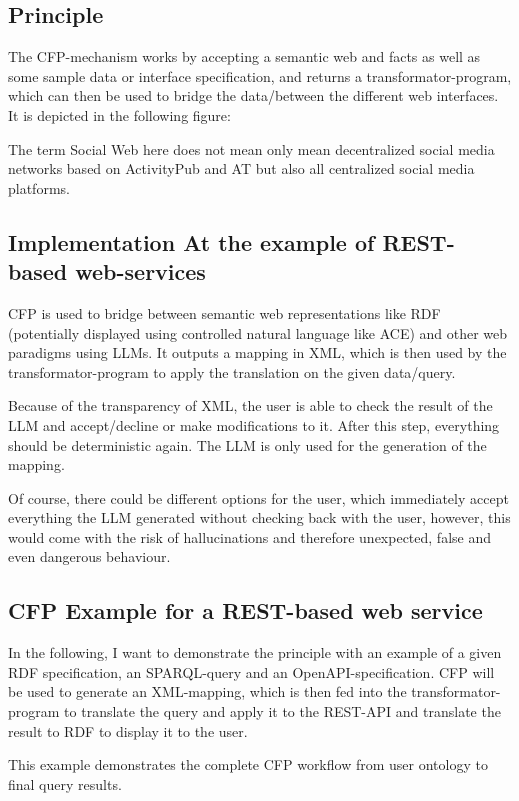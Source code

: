 \documentclass[12pt,a4paper]{article}
\begin{document}
\subsection{Principle}

The CFP-mechanism works by accepting a semantic web and facts as well as some sample data or interface specification, and returns a transformator-program, which can then be used to bridge the data/between the different web interfaces. It is depicted in the following figure:

The term Social Web here does not mean only mean decentralized social media networks based on ActivityPub and AT but also all centralized social media platforms.

\subsection{Implementation At the example of REST-based web-services}

CFP is used to bridge between semantic web representations like RDF (potentially displayed using controlled natural language like ACE) and other web paradigms using LLMs. It outputs a mapping in XML, which is then used by the transformator-program to apply the translation on the given data/query.

Because of the transparency of XML, the user is able to check the result of the LLM and accept/decline or make modifications to it. After this step, everything should be deterministic again. The LLM is only used for the generation of the mapping.

Of course, there could be different options for the user, which immediately accept everything the LLM generated without checking back with the user, however, this would come with the risk of hallucinations and therefore unexpected, false and even dangerous behaviour.

\subsection{CFP Example for a REST-based web service}

In the following, I want to demonstrate the principle with an example of a given RDF specification, an SPARQL-query and an OpenAPI-specification. CFP will be used to generate an XML-mapping, which is then fed into the transformator-program to translate the query and apply it to the REST-API and translate the result to RDF to display it to the user.

This example demonstrates the complete CFP workflow from user ontology to final query results.
\end{document}
